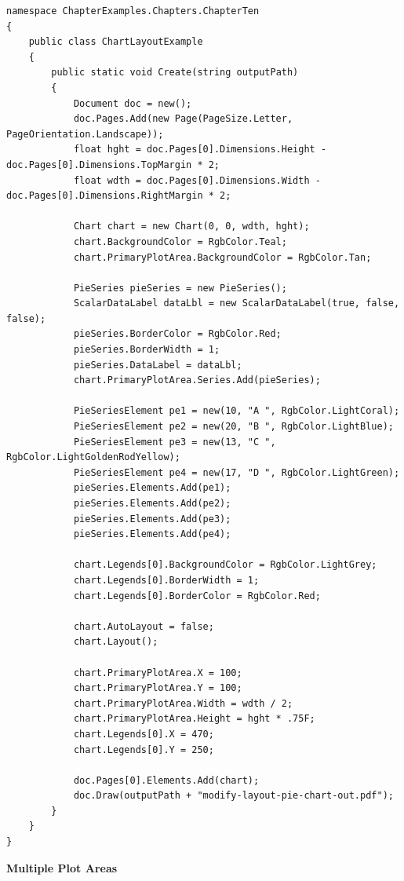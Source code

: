 \documentclass[american,letterpaper]{tufte-book}
\numberwithin{equation}{section}
\numberwithin{figure}{section}
\begin{document}
{\begin{lstlisting}[caption={Modifying a chart's layout manually.},label={lis:Modifying-a-chart's},basicstyle={\small\ttfamily},breaklines=true]
namespace ChapterExamples.Chapters.ChapterTen
{
    public class ChartLayoutExample
    {
        public static void Create(string outputPath)
        {
            Document doc = new();
            doc.Pages.Add(new Page(PageSize.Letter, PageOrientation.Landscape));
            float hght = doc.Pages[0].Dimensions.Height - doc.Pages[0].Dimensions.TopMargin * 2;
            float wdth = doc.Pages[0].Dimensions.Width - doc.Pages[0].Dimensions.RightMargin * 2;

            Chart chart = new Chart(0, 0, wdth, hght);
            chart.BackgroundColor = RgbColor.Teal;
            chart.PrimaryPlotArea.BackgroundColor = RgbColor.Tan;

            PieSeries pieSeries = new PieSeries();
            ScalarDataLabel dataLbl = new ScalarDataLabel(true, false, false);
            pieSeries.BorderColor = RgbColor.Red;
            pieSeries.BorderWidth = 1;
            pieSeries.DataLabel = dataLbl;
            chart.PrimaryPlotArea.Series.Add(pieSeries);

            PieSeriesElement pe1 = new(10, "A ", RgbColor.LightCoral);
            PieSeriesElement pe2 = new(20, "B ", RgbColor.LightBlue);
            PieSeriesElement pe3 = new(13, "C ", RgbColor.LightGoldenRodYellow);
            PieSeriesElement pe4 = new(17, "D ", RgbColor.LightGreen);
            pieSeries.Elements.Add(pe1);
            pieSeries.Elements.Add(pe2);
            pieSeries.Elements.Add(pe3);
            pieSeries.Elements.Add(pe4);

            chart.Legends[0].BackgroundColor = RgbColor.LightGrey;
            chart.Legends[0].BorderWidth = 1;
            chart.Legends[0].BorderColor = RgbColor.Red;
            
            chart.AutoLayout = false;
            chart.Layout();
            
            chart.PrimaryPlotArea.X = 100;
            chart.PrimaryPlotArea.Y = 100;
            chart.PrimaryPlotArea.Width = wdth / 2;
            chart.PrimaryPlotArea.Height = hght * .75F;
            chart.Legends[0].X = 470;
            chart.Legends[0].Y = 250;

            doc.Pages[0].Elements.Add(chart);
            doc.Draw(outputPath + "modify-layout-pie-chart-out.pdf");
        }
    }
}
\end{lstlisting}
\leavevmode\egroup

\noindent\begin{flushleft}
\textbf{Multiple Plot Areas}
\par\end{flushleft}

}
\end{document}
